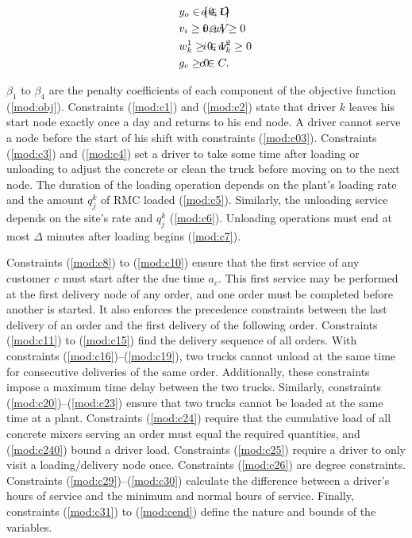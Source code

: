 \documentclass{article}
\begin{document}
\begin{alignat}{3}
    \label{mod:c36}        & y_o \in \{0,1\}     & \hspace{-20mm}  o \in O            \text{ }                     \\
    \label{mod:c37}        & v_i \geq 0,  w_i \geq 0     & \hspace{-20mm}  i \in V         \text{ }                \\
    \label{mod:c38}        & w^1_{k} \geq 0,  w^2_k \geq 0  & \hspace{-20mm}  i \in V         \text{ }        \\
    \label{mod:cend}       & g_c \geq 0    & \hspace{-20mm}  c \in C.  \text{ }
\end{alignat}

$\beta_1$ to $\beta_4$ are the penalty coefficients of each component of the objective function (\ref{mod:obj}). Constraints (\ref{mod:c1}) and (\ref{mod:c2}) state that driver $k$ leaves his start node exactly once a day and returns to his end node. A driver cannot serve a node before the start of his shift with constraints (\ref{mod:c03}). Constraints (\ref{mod:c3}) and (\ref{mod:c4}) set a driver to take some time after loading or unloading to adjust the concrete or clean the truck before moving on to the next node. The duration of the loading operation depends on the plant's loading rate and the amount $q^k_j$ of RMC loaded (\ref{mod:c5}). Similarly, the unloading service depends on the site's rate and $q^k_j$ (\ref{mod:c6}). Unloading operations must end at most $\Delta$ minutes after loading begins (\ref{mod:c7}).

Constraints (\ref{mod:c8}) to (\ref{mod:c10}) ensure that the first service of any customer $c$ must start after the due time $a_c$. This first service may be performed at the first delivery node of any order, and one order must be completed before another is started. It also enforces the precedence constraints between the last delivery of an order and the first delivery of the following order. Constraints (\ref{mod:c11}) to (\ref{mod:c15}) find the delivery sequence of all orders. With constraints (\ref{mod:c16})--(\ref{mod:c19}), two trucks cannot unload at the same time for consecutive deliveries of the same order. Additionally, these constraints impose a maximum time delay between the two trucks. Similarly, constraints (\ref{mod:c20})--(\ref{mod:c23}) ensure that two trucks cannot be loaded at the same time at a plant. Constraints (\ref{mod:c24}) require that the cumulative load of all concrete mixers serving an order must equal the required quantities, and (\ref{mod:c240}) bound a driver load. Constraints (\ref{mod:c25}) require a driver to only visit a loading/delivery node once. Constraints (\ref{mod:c26}) are degree constraints. Constraints (\ref{mod:c29})--(\ref{mod:c30}) calculate the difference between a driver's hours of service and the minimum and normal hours of service. Finally, constraints (\ref{mod:c31}) to (\ref{mod:cend}) define the nature and bounds of the variables.
\end{document}
